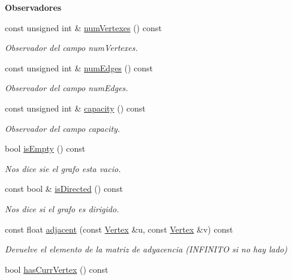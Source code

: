 \begin{Indent}{\bf Observadores}\par
\begin{DoxyCompactItemize}
\item 
const unsigned int \& \hyperlink{classedi_1_1GraphMatrix_ada3e3accdfeb7dc48482560cc2842f59}{num\+Vertexes} () const 
\begin{DoxyCompactList}\small\item\em Observador del campo num\+Vertexes. \end{DoxyCompactList}\item 
const unsigned int \& \hyperlink{classedi_1_1GraphMatrix_a4f5efb372ff3e02a42f2b77ba2932b04}{num\+Edges} () const 
\begin{DoxyCompactList}\small\item\em Observador del campo num\+Edges. \end{DoxyCompactList}\item 
const unsigned int \& \hyperlink{classedi_1_1GraphMatrix_afbcaf9d1a05c4ae921325641148c0a63}{capacity} () const 
\begin{DoxyCompactList}\small\item\em Observador del campo capacity. \end{DoxyCompactList}\item 
bool \hyperlink{classedi_1_1GraphMatrix_aada33cb444bf07048b782c0ed3915600}{is\+Empty} () const 
\begin{DoxyCompactList}\small\item\em Nos dice sie el grafo esta vacio. \end{DoxyCompactList}\item 
const bool \& \hyperlink{classedi_1_1GraphMatrix_ac9ecf45464596cc29ee2e70ce8342c4c}{is\+Directed} () const 
\begin{DoxyCompactList}\small\item\em Nos dice si el grafo es dirigido. \end{DoxyCompactList}\item 
const float \hyperlink{classedi_1_1GraphMatrix_a0e26027ed3a86fa2ec48b1be7f67d4a3}{adjacent} (const \hyperlink{classedi_1_1Vertex}{Vertex} \&u, const \hyperlink{classedi_1_1Vertex}{Vertex} \&v) const 
\begin{DoxyCompactList}\small\item\em Devuelve el elemento de la matriz de adyacencia (I\+N\+F\+I\+N\+I\+T\+O si no hay lado) \end{DoxyCompactList}\item 
bool \hyperlink{classedi_1_1GraphMatrix_afa8535e20eca6a765399e2d18859cd97}{has\+Curr\+Vertex} () const 

\end{DoxyCompactItemize}
\end{Indent}
